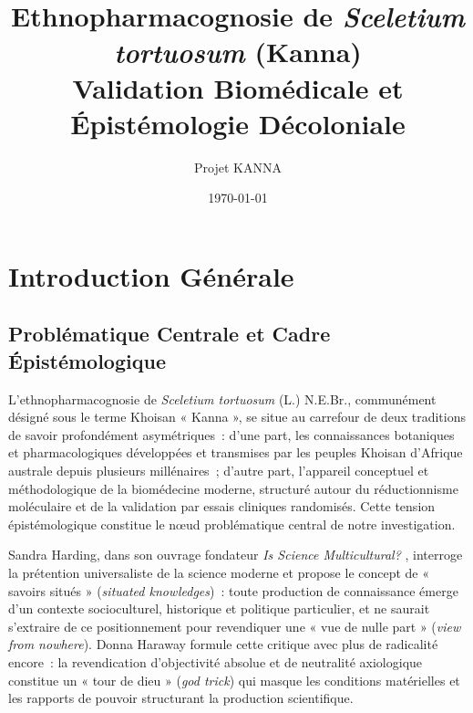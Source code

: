 \documentclass[12pt,a4paper,twoside]{book}
\title{Ethnopharmacognosie de \textit{Sceletium tortuosum} (Kanna)\\[0.5cm]
\large Validation Biomédicale et Épistémologie Décoloniale}
\author{Projet KANNA}
\date{\today}
\newcommand{\kanna}{\textit{Sceletium tortuosum}}
\begin{document}
\maketitle

\tableofcontents
\clearpage


\chapter*{Introduction Générale}

\section{Problématique Centrale et Cadre Épistémologique}

L'ethnopharmacognosie de \kanna{} (L.) N.E.Br., communément désigné sous le terme Khoisan « Kanna », se situe au carrefour de deux traditions de savoir profondément asymétriques~: d'une part, les connaissances botaniques et pharmacologiques développées et transmises par les peuples Khoisan d'Afrique australe depuis plusieurs millénaires~; d'autre part, l'appareil conceptuel et méthodologique de la biomédecine moderne, structuré autour du réductionnisme moléculaire et de la validation par essais cliniques randomisés. Cette tension épistémologique constitue le nœud problématique central de notre investigation.

Sandra Harding, dans son ouvrage fondateur \textit{Is Science Multicultural?} \parencite{harding1998}, interroge la prétention universaliste de la science moderne et propose le concept de « savoirs situés » (\textit{situated knowledges})~: toute production de connaissance émerge d'un contexte socioculturel, historique et politique particulier, et ne saurait s'extraire de ce positionnement pour revendiquer une « vue de nulle part » (\textit{view from nowhere}). Donna Haraway \parencite{haraway1988} formule cette critique avec plus de radicalité encore~: la revendication d'objectivité absolue et de neutralité axiologique constitue un « tour de dieu » (\textit{god trick}) qui masque les conditions matérielles et les rapports de pouvoir structurant la production scientifique.
\end{document}

